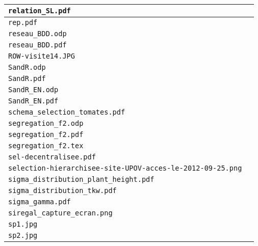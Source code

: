 \begin{center}
\begin{supertabular}{p{.8\textwidth}c}
\texttt{relation\_SL.pdf} & \cite{relation_SL} \\ \hline

\texttt{rep.pdf} & \cite{rep} \\ \hline

\texttt{reseau\_BDD.odp} & \cite{reseau_BDD} \\
\texttt{reseau\_BDD.pdf} & \\ \hline

\texttt{ROW-visite14.JPG} & \cite{ROW-visite14} \\ \hline

\texttt{SandR.odp} & \cite{SandR} \\
\texttt{SandR.pdf} & \\ \hline

\texttt{SandR\_EN.odp} & \cite{SandR_EN} \\
\texttt{SandR\_EN.pdf} & \\ \hline

\texttt{schema\_selection\_tomates.pdf} & \cite{schema_selection_tomates} \\ \hline

\texttt{segregation\_f2.odp} & \cite{segregation_f2} \\ \hline
\texttt{segregation\_f2.pdf} &  \\
\texttt{segregation\_f2.tex} & \\

\texttt{sel-decentralisee.pdf} & \cite{sel-decentralisee} \\ \hline

\texttt{selection-hierarchisee-site-UPOV-acces-le-2012-09-25.png} & \cite{selection-hierarchisee-site-UPOV-acces-le-2012-09-25} \\ \hline

\texttt{sigma\_distribution\_plant\_height.pdf} & \cite{sigma_distribution_plant_height} \\ \hline

\texttt{sigma\_distribution\_tkw.pdf} & \cite{sigma_distribution_tkw} \\ \hline

\texttt{sigma\_gamma.pdf} & \cite{sigma_gamma} \\ \hline

\texttt{siregal\_capture\_ecran.png} & \cite{siregal_capture_ecran} \\ \hline

\texttt{sp1.jpg} & \cite{sp1} \\ \hline

\texttt{sp2.jpg} & \cite{sp2} \\ \hline


\end{supertabular}
\end{center}
